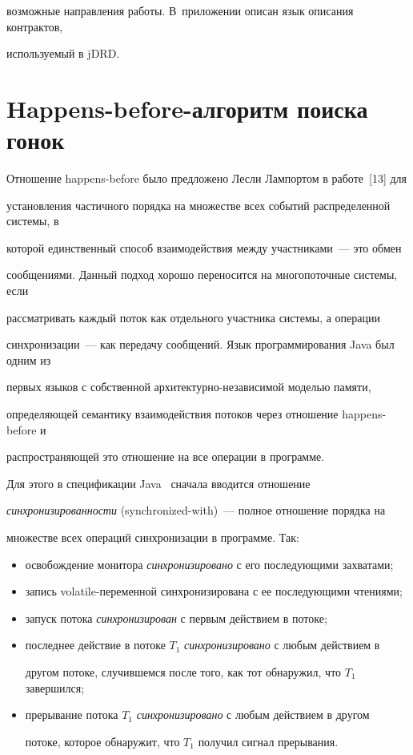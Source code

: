 возможные направления работы. В~приложении описан язык описания контрактов,

используемый в jDRD.



      \vspace*{-6pt}



\section{Happens-before-алгоритм поиска гонок}



  Отношение happens-before было предложено Лесли Лампортом в работе~[13] для

установления частичного порядка на множестве всех событий распределенной сис\-те\-мы, в

которой единственный способ взаимодействия между участниками~--- это обмен

сообщениями. Данный подход хорошо переносится на многопоточные сис\-те\-мы, если

рассматривать каждый поток как отдельного участника системы, а операции

синхронизации~--- как передачу сообщений. Язык программирования Java был одним из

первых языков с собственной ар\-хи\-тек\-тур\-но-не\-за\-ви\-си\-мой мо\-делью памяти,

определяющей семантику взаимодействия потоков через отношение happens-before и

распространяющей это отношение на все операции в программе.



  Для этого в спецификации Java~\cite{14-ts} сначала вводится отношение

\textit{синхронизированности} (synchronized-with)~--- полное отношение порядка на

множестве всех операций синхронизации в программе. Так:

  \begin{itemize}

\item освобождение монитора \textit{синхронизировано} с его последующими захватами;

\item запись volatile-переменной синхронизирована с ее последующими чтениями;

\item запуск потока \textit{синхронизирован} с первым действием в потоке;

\item последнее действие в потоке $T_1$ \textit{синхронизировано} с любым действием в

другом потоке, случившемся после того, как тот обнаружил, что $T_1$ завершился;

\item прерывание потока $T_1$ \textit{синхронизировано} с любым действием в другом

потоке, которое обнаружит, что $T_1$ получил сигнал прерывания.

  \end{itemize}



